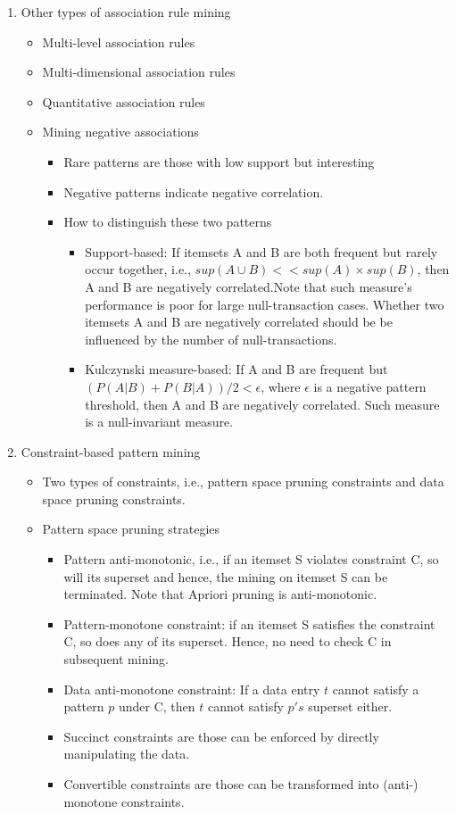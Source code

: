 \documentclass[12pt, a4paper]{article}
\begin{document}
\begin{enumerate}
\item Other types of association rule mining
\begin{itemize}
\item Multi-level association rules

\item Multi-dimensional association rules

\item Quantitative association rules

\item Mining negative associations
 \begin{itemize}
  \item Rare patterns are those with low support but interesting
  \item Negative patterns indicate negative correlation.
  \item How to distinguish these two patterns
   \begin{itemize}
    \item Support-based: If itemsets A and B are both frequent but rarely occur together, i.e., $sup(A \cup B) << sup(A) \times sup(B)$, then A and B are negatively correlated.Note that such measure's performance is poor for large null-transaction cases. Whether two itemsets A and B are negatively correlated should be be influenced by the number of null-transactions.
    \item Kulczynski measure-based: If A and B are frequent but $(P(A|B) + P(B|A))/2< \epsilon$, where $\epsilon$ is a negative pattern threshold, then A and B are negatively correlated. Such measure is a null-invariant measure.
   \end{itemize}
 \end{itemize}
\end{itemize}

\item Constraint-based pattern mining
\begin{itemize}
 \item Two types of constraints, i.e., pattern space pruning constraints and data space pruning constraints.
 \item Pattern space pruning strategies
 \begin{itemize}
  \item Pattern anti-monotonic, i.e., if an itemset S violates constraint C, so will its superset and hence, the mining on itemset S can be terminated. Note that Apriori pruning is anti-monotonic.
  \item Pattern-monotone constraint: if an itemset S satisfies the constraint C, so does any of its superset. Hence, no need to check C in subsequent mining.
  \item Data anti-monotone constraint: If a data entry $t$ cannot satisfy a pattern $p$ under C, then $t$ cannot satisfy $p's$ superset either.
  \item Succinct constraints are those can be enforced by directly manipulating the data.
  \item Convertible constraints are those can be transformed into (anti-) monotone constraints.
 \end{itemize}
\end{itemize}
\end{enumerate}
\end{document}
